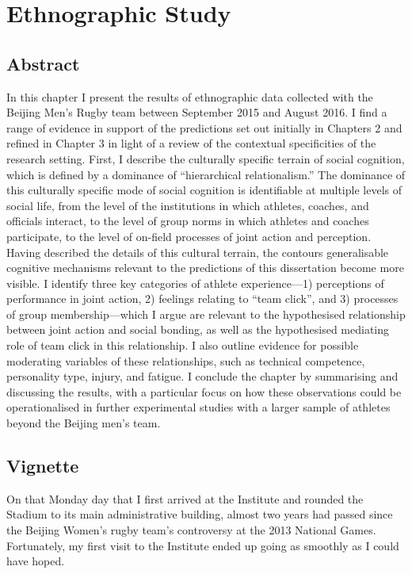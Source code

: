 


  \chapter{\label{4ethnographicField}Ethnographic Study}

  \minitoc
  \section{Abstract}
  In this chapter I present the results of ethnographic data collected with the Beijing Men's Rugby team between September 2015 and August 2016.  I find a range of evidence in support of the predictions set out initially in Chapters 2 and refined in Chapter 3 in light of a review of the contextual specificities of the research setting.  First, I describe the culturally specific terrain of social cognition, which is defined by a dominance of ``hierarchical relationalism.''  The dominance of this culturally specific mode of social cognition is identifiable at multiple levels of social life, from the level of the institutions in which athletes, coaches, and officials interact, to the level of group norms in which athletes and coaches participate, to the level of on-field processes of joint action and perception. Having described the details of this cultural terrain, the contours generalisable cognitive mechanisms relevant to the predictions of this dissertation become more visible. I identify three key categories of athlete experience---1) perceptions of performance in joint action, 2) feelings relating to ``team click'', and 3) processes of group membership---which I argue are relevant to the hypothesised relationship between joint action and social bonding, as well as the hypothesised mediating role of team click in this relationship. I also outline evidence for possible moderating variables of these relationships, such as technical competence, personality type, injury, and fatigue. I conclude the chapter by summarising and discussing the results, with a particular focus on how these observations could be operationalised in further experimental studies with a larger sample of athletes beyond the Beijing men's team.



  \section{Vignette}

  On that Monday day that I first arrived at the Institute and rounded the Stadium to its main administrative building, almost two years had passed since the Beijing Women's rugby team's controversy at the 2013 National Games.  Fortunately, my first visit to the Institute ended up going as smoothly as I could have hoped.

